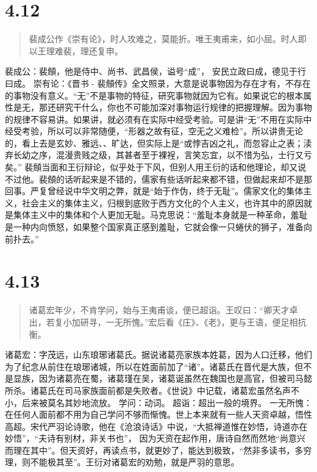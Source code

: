 \documentclass[]{book}
\begin{document}
\section{4.12}\label{section-191}

\begin{quote}
裴成公作《崇有论》，时人攻难之，莫能折。唯王夷甫来，如小屈。时人即以王理难裴，理还复申。
\end{quote}

裴成公：裴頠，他是侍中、尚书、武昌侯，谥号``成''，
安民立政曰成，德见于行曰成。 崇有论：《晋书 -
裴頠传》全文照录，大意是说事物因为存在才有，不存在的事物没有意义。``无''不是事物的特征，研究事物就因为它有。如果说它的根本属性是无，那还研究干什么，你也不可能加深对事物运行规律的把握理解。因为事物的规律不容易讲。如果讲，就必须有在实际中经受考验。可是讲``无''不用在实际中经受考验，所以可以非常随便，``形器之故有征，空无之义难检''。所以讲贵无论的，看上去是玄妙、雅远、、旷达，但实际上是``或悖吉凶之礼，而忽容止之表；渎弃长幼之序，混漫贵贱之级，其甚者至于裸裎，言笑忘宜，以不惜为弘，士行又亏矣。''
裴頠当面和王衍辩论，似乎处于下风，但别人用王衍的话和他理论，却又说不过他。裴頠的话听起来是不错的，儒家有些话听起来都不错，但做起来却不是那回事。严复曾经说中华文明之弊，就是``始于作伪，终于无耻''。儒家文化的集体主义，社会主义的集体主义，归根到底败于西方文化的个人主义，也许其中的原因就是集体主义中的集体和个人更加无耻。马克思说：``羞耻本身就是一种革命，羞耻是一种内向愤怒，如果整个国家真正感到羞耻，它就会像一只蜷伏的狮子，准备向前扑去。''

\section{4.13}\label{section-192}

\begin{quote}
诸葛宏年少，不肯学问，始与王夷甫谈，便已超诣。王叹曰：``卿天才卓出，若复小加研寻，一无所愧。''宏后看《庄》、《老》，更与王语，便足相抗衡。
\end{quote}

诸葛宏：字茂远，山东琅琊诸葛氏。据说诸葛亮家族本姓葛，因为人口迁移，他们为了纪念从前住在琅琊诸城，所以在姓面前加了``诸''。诸葛氏在晋代是大族，但不是显族，因为诸葛亮在蜀，诸葛瑾在吴，诸葛诞虽然在魏国也是高官，但被司马懿所杀。诸葛氏在司马家族面前都是失败者。《世说》中记载，诸葛宏虽然名声不小，后来被莫名其妙地流放。
学问：动词。 超诣：超出一般的境界。
一无所愧：在任何人面前都不用为自己学问不够而惭愧。世上本来就有一些人天资卓越，悟性高超。宋代严羽论诗歌，他在《沧浪诗话》中说，``大抵禅道惟在妙悟，诗道亦在妙悟''，``夫诗有别材，非关书也''，
因为天资在起作用，唐诗自然而然地``尚意兴而理在其中''。但天资好，再读点书，就更妙了，能达到极致，``然非多读书，多穷理，则不能极其至''。王衍对诸葛宏的劝勉，就是严羽的意思。
\end{document}
